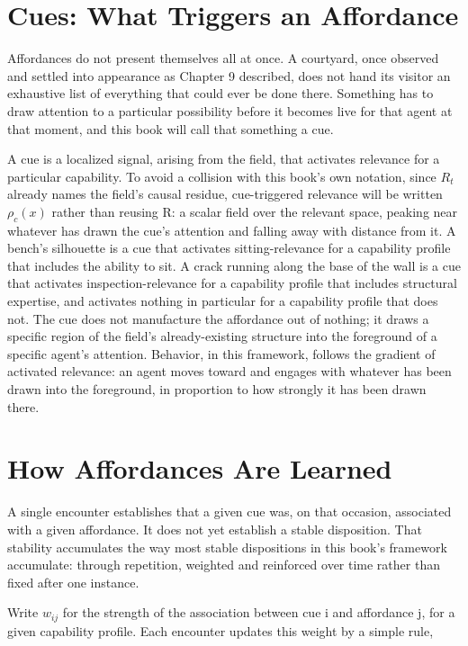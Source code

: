\section{Cues: What Triggers an Affordance}

Affordances do not present themselves all at once. A courtyard, once observed and settled into appearance as Chapter 9 described, does not hand its visitor an exhaustive list of everything that could ever be done there. Something has to draw attention to a particular possibility before it becomes live for that agent at that moment, and this book will call that something a cue.

A cue is a localized signal, arising from the field, that activates relevance for a particular capability. To avoid a collision with this book's own notation, since \(R_t\) already names the field's causal residue, cue-triggered relevance will be written \(\rho_c(x)\) rather than reusing R: a scalar field over the relevant space, peaking near whatever has drawn the cue's attention and falling away with distance from it. A bench's silhouette is a cue that activates sitting-relevance for a capability profile that includes the ability to sit. A crack running along the base of the wall is a cue that activates inspection-relevance for a capability profile that includes structural expertise, and activates nothing in particular for a capability profile that does not. The cue does not manufacture the affordance out of nothing; it draws a specific region of the field's already-existing structure into the foreground of a specific agent's attention. Behavior, in this framework, follows the gradient of activated relevance: an agent moves toward and engages with whatever has been drawn into the foreground, in proportion to how strongly it has been drawn there.

\section{How Affordances Are Learned}

A single encounter establishes that a given cue was, on that occasion, associated with a given affordance. It does not yet establish a stable disposition. That stability accumulates the way most stable dispositions in this book's framework accumulate: through repetition, weighted and reinforced over time rather than fixed after one instance.

Write \(w_{ij}\) for the strength of the association between cue i and affordance j, for a given capability profile. Each encounter updates this weight by a simple rule,


